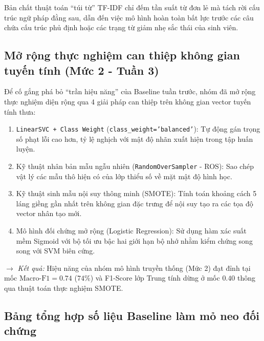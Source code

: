 \documentclass[conference,10pt,a4paper]{IEEEtran}
\begin{document}
Bản chất thuật toán ``túi từ'' TF-IDF chỉ đếm tần suất từ đơn lẻ mà tách rời cấu trúc ngữ pháp đằng sau, dẫn đến việc mô hình hoàn toàn bất lực trước các câu chứa cấu trúc phủ định hoặc các trạng từ giảm nhẹ sắc thái của sinh viên.

\subsection{Mở rộng thực nghiệm can thiệp không gian tuyến tính (Mức 2 - Tuần 3)}
Để cố gắng phá bỏ ``trần hiệu năng'' của Baseline tuần trước, nhóm đã mở rộng thực nghiệm diện rộng qua 4 giải pháp can thiệp trên không gian vector tuyến tính thưa:
\begin{enumerate}
    \item \texttt{LinearSVC~+~Class~Weight} (\texttt{class\_weight='balanced'}): Tự động gán trọng số phạt lỗi cao hơn, tỷ lệ nghịch với mật độ nhãn xuất hiện trong tập huấn luyện.
    \item Kỹ thuật nhân bản mẫu ngẫu nhiên (\texttt{RandomOverSampler} - ROS): Sao chép vật lý các mẫu thô hiện có của lớp thiểu số về mặt mật độ hình học.
    \item Kỹ thuật sinh mẫu nội suy thông minh (SMOTE): Tính toán khoảng cách 5 láng giềng gần nhất trên không gian đặc trưng để nội suy tạo ra các tọa độ vector nhân tạo mới.
    \item Mô hình đối chứng mở rộng (Logistic Regression): Sử dụng hàm xác suất mềm Sigmoid với bộ tối ưu bậc hai giới hạn bộ nhớ nhằm kiểm chứng song song với SVM biên cứng.
\end{enumerate}

\noindent $\rightarrow$ \textit{Kết quả:} Hiệu năng của nhóm mô hình truyền thống (Mức 2) đạt đỉnh tại mốc $\text{Macro-F1} = 0.74$ ($74\%$) và F1-Score lớp Trung tính dừng ở mốc $0.40$ thông qua thuật toán thực nghiệm SMOTE.

\subsection{Bảng tổng hợp số liệu Baseline làm mỏ neo đối chứng}
\end{document}
